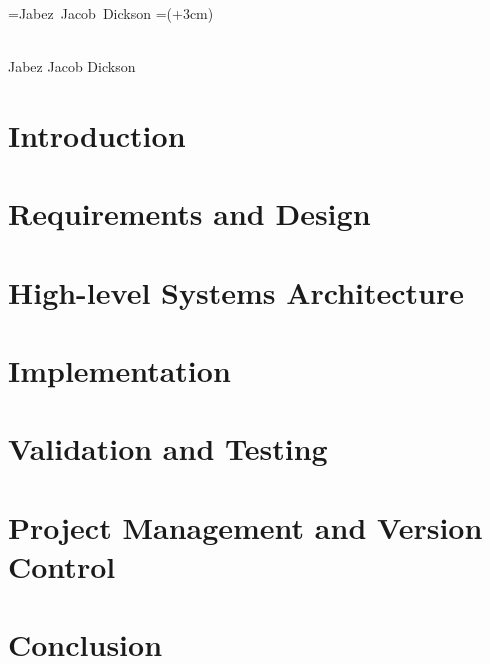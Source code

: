 \documentclass[12pt]{report}
\def\signature#1{%
  \setbox\namebox=\hbox{#1}
  \signboxdim=\dimexpr(\wd\namebox+3cm)
  \parbox[t]{\signboxdim}{%
    \centering
    \hrulefill\\
    #1
  \par}%
}
\numberwithin{figure}{chapter}
\begin{document}
\noindent\signature{Jabez Jacob Dickson}
\newpage


\tableofcontents


\chapter{Introduction}


\chapter{Requirements and Design}


\chapter{High-level Systems Architecture}


\chapter{Implementation}


\chapter{Validation and Testing}


\chapter{Project Management and Version Control}


\chapter{Conclusion}


\newpage


\end{document}
